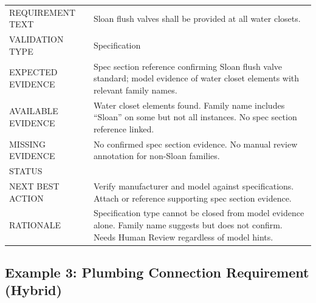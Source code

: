 \documentclass[10pt,letterpaper]{article}
\newcommand{\smalllabel}[1]{{\scriptsize\textcolor{emaMuted}{\MakeUppercase{#1}}}}
\newcommand{\badge}[3]{\tcbox[on line,colback=#2,colframe=#2,boxrule=0pt,
    arc=2mm,left=5pt,right=5pt,top=2pt,bottom=2pt]{\scriptsize\textbf{\textcolor{#3}{#1}}}}
\newcommand{\reviewbadge}{\badge{Needs Human Review}{emaAmberBg}{emaAmber}}
\begin{document}
\begin{tcolorbox}[colback=white]
\begin{tabularx}{\textwidth}{p{1.4in}p{4.8in}}
\toprule
\smalllabel{Requirement Text} & Sloan flush valves shall be provided at all water closets. \\
\smalllabel{Validation Type} & Specification \\
\smalllabel{Expected Evidence} & Spec section reference confirming Sloan flush valve standard;
  model evidence of water closet elements with relevant family names. \\
\smalllabel{Available Evidence} & Water closet elements found. Family name includes ``Sloan'' on
  some but not all instances. No spec section reference linked. \\
\smalllabel{Missing Evidence} & No confirmed spec section evidence. No manual review annotation for
  non-Sloan families. \\
\smalllabel{Status} & \reviewbadge \\
\smalllabel{Next Best Action} & Verify manufacturer and model against specifications. Attach or
  reference supporting spec section evidence. \\
\smalllabel{Rationale} & Specification type cannot be closed from model evidence alone. Family name
  suggests but does not confirm. Needs Human Review regardless of model hints. \\
\bottomrule
\end{tabularx}
\end{tcolorbox}

\subsection*{Example 3: Plumbing Connection Requirement (Hybrid)}
\end{document}
